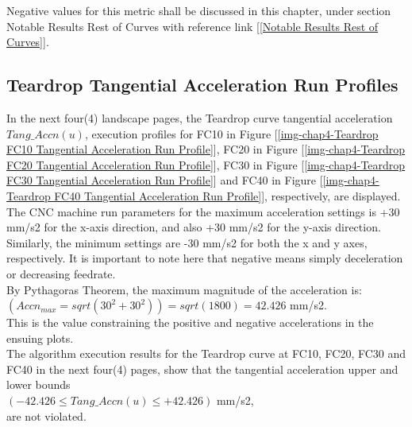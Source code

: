 Negative values for this metric shall be discussed in this chapter, under section Notable Results Rest of Curves with reference link [\ref{Notable Results Rest of Curves}].\\


\clearpage
\pagebreak

\subsection{Teardrop Tangential Acceleration Run Profiles}
\label{ssec-chap4-Teardrop FC10 Tangential Acceleration Run Profile}

In the next four(4) landscape pages, the Teardrop curve tangential acceleration $Tang\_Accn(u)$, execution profiles for 
FC10 in Figure [\ref{img-chap4-Teardrop FC10 Tangential Acceleration Run Profile}], 
FC20 in Figure [\ref{img-chap4-Teardrop FC20 Tangential Acceleration Run Profile}], 
FC30 in Figure [\ref{img-chap4-Teardrop FC30 Tangential Acceleration Run Profile}] and 
FC40 in Figure [\ref{img-chap4-Teardrop FC40 Tangential Acceleration Run Profile}], 
respectively, are displayed. \\

The CNC machine run parameters for the maximum acceleration settings is +30 mm/s2 for the x-axis direction, and also +30 mm/s2 for the y-axis direction. Similarly, the minimum settings are -30 mm/s2 for both the x and y axes, respectively. It is important to note here that negative means simply deceleration or decreasing feedrate.\\

\noindent
By Pythagoras Theorem, the maximum magnitude of the acceleration is:\\
$(Accn_{max} = sqrt( 30^{2} + 30^{2} )) = sqrt(1800) = 42.426$ mm/s2. \\
\noindent 
This is the value constraining the positive and negative accelerations in the ensuing plots. \\

\noindent
The algorithm execution results for the Teardrop curve at FC10, FC20, FC30 and FC40 in the next four(4) pages, show that the tangential acceleration upper and lower bounds \\
$(-42.426 \le Tang\_Accn(u) \le +42.426 )$ mm/s2, \\
\noindent
are not violated.\\

